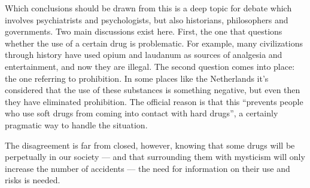 Which conclusions should be drawn from this is a deep topic for debate which involves psychiatrists and psychologists, but also historians, philosophers and governments. Two main discussions exist here. First, the one that questions whether the use of a certain drug is problematic. For example, many civilizations through history have used opium and laudanum as sources of analgesia and entertainment, and now they are illegal. The second question comes into place: the one referring to prohibition. In some places like the Netherlands it's considered that the use of these substances is something negative, but even then they have eliminated prohibition. The official reason is that this \enquote{prevents people who use soft drugs from coming into contact with hard drugs}, a certainly pragmatic way to handle the situation.

The disagreement is far from closed, however, knowing that some drugs will be perpetually in our society --- and that surrounding them with mysticism will only increase the number of accidents --- the need for information on their use and risks is needed.
